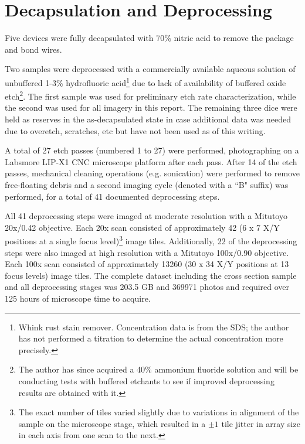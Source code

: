 \documentclass[letterpaper]{article}
\begin{document}
\clearpage
\section{Decapsulation and Deprocessing}

Five devices were fully decapsulated with 70\% nitric acid to remove the package and bond wires.

Two samples were deprocessed with a commercially available aqueous solution of unbuffered 1-3\% hydrofluoric acid\footnote{Whink rust stain remover. Concentration data is from the SDS; the author has not performed a titration to determine the actual concentration more precisely.} due to lack of availability of buffered oxide etch\footnote{The author has since acquired a 40\% ammonium fluoride solution and will be conducting tests with buffered etchants to see if improved deprocessing results are obtained with it.}. The first sample was used for preliminary etch rate characterization, while the second was used for all imagery in this report. The remaining three dice were held as reserves in the as-decapsulated state in case additional data was needed due to overetch, scratches, etc but have not been used as of this writing.

A total of 27 etch passes (numbered 1 to 27) were performed, photographing on a Labsmore LIP-X1 CNC microscope platform after each pass. After 14 of the etch passes, mechanical cleaning operations (e.g. sonication) were performed to remove free-floating debris and a second imaging cycle (denoted with a ``B" suffix) was performed, for a total of 41 documented deprocessing steps.

All 41 deprocessing steps were imaged at moderate resolution with a Mitutoyo 20x/0.42 objective. Each 20x scan consisted of approximately 42 (6 x 7 X/Y positions at a single focus level)\footnote{The exact number of tiles varied slightly due to variations in alignment of the sample on the microscope stage, which resulted in a $\pm 1$ tile jitter in array size in each axis from one scan to the next.} image tiles. Additionally, 22 of the deprocessing steps were also imaged at high resolution with a Mitutoyo 100x/0.90 objective. Each 100x scan consisted of approximately 13260 (30 x 34 X/Y positions at 13 focus levels) image tiles. The complete dataset including the cross section sample and all deprocessing stages was 203.5 GB and 369971 photos and required over 125 hours of microscope time to acquire.
\end{document}
